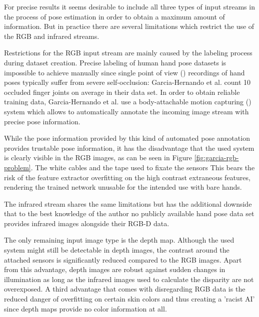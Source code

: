 For precise results it seems desirable to include all three types of input streams in the process of pose estimation in order to obtain a maximum amount of information. But in practice there are several limitations which restrict the use of the RGB and infrared streams.

Restrictions for the RGB input stream are mainly caused by the labeling process during dataset creation. Precise labeling of human hand pose datasets is impossible to achieve manually since single point of view () recordings of hand poses typically suffer from severe self-occlusion: Garcia-Hernando et al. \cite{GarciaHernando2017} count 10 occluded finger joints on average in their data set. In order to obtain reliable training data, Garcia-Hernando et al. use a body-attachable motion capturing () system which allows to automatically annotate the incoming image stream with precise pose information. 

While the pose information provided by this kind of automated pose annotation provides trustable pose information, it has the disadvantage that the used  system is clearly visible in the RGB images, as can be seen in Figure \ref{fig:garcia-rgb-problem}. The white cables and the tape used to fixate the sensors This bears the risk of the feature extractor overfitting on the high contrast extraneous features, rendering the trained network unusable for the intended use with bare hands. 

The infrared stream shares the same limitations but has the additional downside that to the best knowledge of the author no publicly available hand pose data set provides infrared images alongside their RGB-D data. 

The only remaining input image type is the depth map. Although the used  system might still be detectable in depth images, the contrast around the attached sensors is significantly reduced compared to the RGB images. Apart from this advantage, depth images are robust against sudden changes in illumination as long as the infrared images used to calculate the disparity are not overexposed. A third advantage that comes with disregarding RGB data is the reduced danger of overfitting on certain skin colors and thus creating a 'racist AI' \cite{Murray2019, Dietz2019, Solly2019} since depth maps provide no color information at all.

